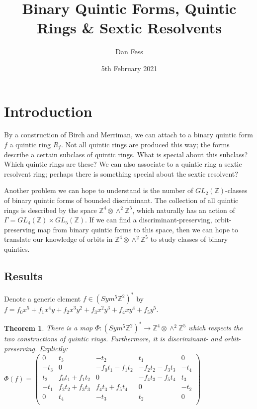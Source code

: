 \documentclass{article}
\begin{document}
\title{Binary Quintic Forms, Quintic Rings \& Sextic Resolvents}
\author{Dan Fess}
\date{5th February 2021}
\maketitle

\newtheorem{theorem}{Theorem}
\newtheorem{lemma}{Lemma}[section]
\newtheorem{prop}[lemma]{Proposition}
\newtheorem{corollary}[lemma]{Corollary}
\newtheorem{conjecture}{Conjecture}
\newtheorem{definition}[lemma]{Definition}

\section{Introduction}

By a construction of Birch and Merriman, we can attach to a binary quintic form $f$ a quintic ring $R_f$.  Not all quintic rings are produced this way; the forms describe a certain subclass of quintic rings.  What is special about this subclass?  Which quintic rings are these?  We can also associate to a quintic ring a sextic resolvent ring; perhaps there is something special about the sextic resolvent?

Another problem we can hope to understand is the number of $GL_2(\mathbb{Z})$-classes of binary quintic forms of bounded discriminant.  The collection of all quintic rings is described by the space $\mathbb{Z}^4 \otimes \wedge^2 \mathbb{Z}^5$, which naturally has an action of $\Gamma = GL_4(\mathbb{Z}) \times GL_5(\mathbb{Z})$.  If we can find a discriminant-preserving, orbit-preserving map from binary quintic forms to this space, then we can hope to translate our knowledge of orbits in $\mathbb{Z}^4 \otimes \wedge^2 \mathbb{Z}^5$ to study classes of binary quintics.

\subsection{Results}

Denote a generic element $f \in (Sym^5 \mathbb{Z}^2)^*$ by $f = f_0 x^5 + f_1 x^4 y + f_2 x^3 y^2 + f_3 x^2 y^3 + f_4 x y^4 + f_5 y^5$.

\begin{theorem}
There is a map $\Phi : (Sym^5 \mathbb{Z}^2)^* \to \mathbb{Z}^4 \otimes \wedge^2 \mathbb{Z}^5$ which respects the two constructions of quintic rings.  Furthermore, it is discriminant- and orbit-preserving.  Explictly:\\

$\Phi(f) = \begin{pmatrix}
0 & t_3 & - t_2 & t_1 & 0\\
- t_3 & 0 & -  f_0 t_1 -  f_1 t_2 & -  f_2 t_2 -  f_3 t_3 & - t_4\\
t_2 &  f_0 t_1 +  f_1 t_2 & 0 & -  f_4 t_3 -  f_5 t_4 & t_3\\
- t_1 &  f_2 t_2 +  f_3 t_3 &  f_4 t_3 +  f_5 t_4 & 0 & - t_2\\
0 & t_4 & - t_3 & t_2 & 0\\
\end{pmatrix}$\\
\end{theorem}
\end{document}
